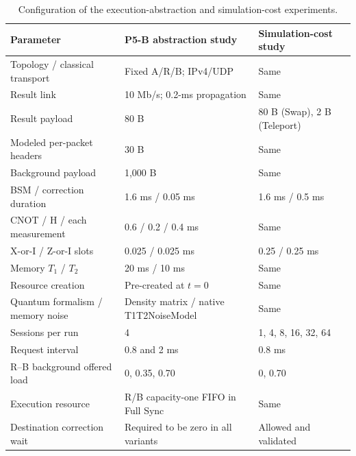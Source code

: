 \begin{table}[t]
\centering
\caption{Configuration of the execution-abstraction and simulation-cost experiments.}
\label{tab:experiment-parameters}
\begin{tabular}{lll}
\hline
Parameter & P5-B abstraction study & Simulation-cost study \\
\hline
Topology / classical transport & Fixed A/R/B; IPv4/UDP & Same \\
Result link & 10 Mb/s; 0.2-ms propagation & Same \\
Result payload & 80 B & 80 B (Swap), 2 B (Teleport) \\
Modeled per-packet headers & 30 B & Same \\
Background payload & 1,000 B & Same \\
BSM / correction duration & 1.6 ms / 0.05 ms & 1.6 ms / 0.5 ms \\
CNOT / H / each measurement & 0.6 / 0.2 / 0.4 ms & Same \\
X-or-I / Z-or-I slots & 0.025 / 0.025 ms & 0.25 / 0.25 ms \\
Memory $T_1$ / $T_2$ & 20 ms / 10 ms & Same \\
Resource creation & Pre-created at $t=0$ & Same \\
Quantum formalism / memory noise & Density matrix / native T1T2NoiseModel & Same \\
Sessions per run & 4 & 1, 4, 8, 16, 32, 64 \\
Request interval & 0.8 and 2 ms & 0.8 ms \\
R--B background offered load & 0, 0.35, 0.70 & 0, 0.70 \\
Execution resource & R/B capacity-one FIFO in Full Sync & Same \\
Destination correction wait & Required to be zero in all variants & Allowed and validated \\
\hline
\end{tabular}
\end{table}

